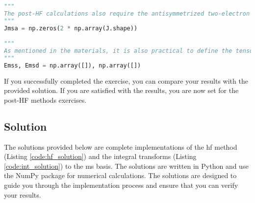 \begin{lstlisting}[language=Python, caption={Integral transform exercise code.}, label=code:int_exercise]
"""
The post-HF calculations also require the antisymmetrized two-electron integrals in the molecular spinorbital basis. These integrals are essential for the MP2 and CC calculations. Please define the "Jmsa" tensor as the antisymmetrized two-electron integrals in the molecular spinorbital basis.
"""
Jmsa = np.zeros(2 * np.array(J.shape))

"""
As mentioned in the materials, it is also practical to define the tensors of reciprocal orbital energy differences in the molecular spinorbital basis. These tensors are essential for the MP2 and CC calculations. Please define the "Emss", "Emsd" and "Emst" tensors as tensors of single, double and triple excitation energies, respectively. The configuration interaction will not need these tensors, so you can skip this step if you don't plan to program the CI method. The MP methods will require only the "Emsd" tensor, while the CC method will need both tensors.
"""
Emss, Emsd = np.array([]), np.array([])
\end{lstlisting}

If you successfully completed the exercise, you can compare your results with the provided solution. If you are satisfied with the results, you are now set for the post-HF methods exercises.

\subsection{Solution}

The solutions provided below are complete implementations of the \acrshort{hf} method (Listing \ref{code:hf_solution}) and the integral transforms (Listing \ref{code:int_solution}) to the \acrshort{ms} basis. The solutions are written in Python and use the NumPy package for numerical calculations. The solutions are designed to guide you through the implementation process and ensure that you can verify your results.

